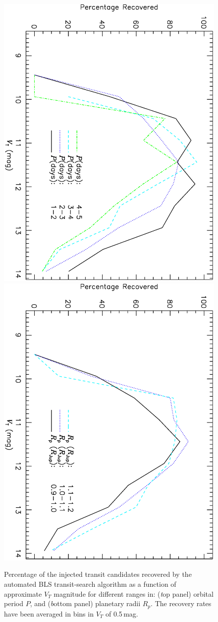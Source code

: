 \begin{figure}
\begin{center}
\centering
\includegraphics[width=.55\textwidth, angle=90]{7_comp_d}\\
\includegraphics[width=.55\textwidth, angle=90]{7_comp_e}\\
\caption[BLS recovery rates for different orbital periods and planetary radii]{%
Percentage of the injected transit candidates recovered by the automated BLS transit-search algorithm as a function of approximate $V_{T}$ magnitude for different ranges in: %
({\textit top panel}) orbital period $P$, and %
({\textit bottom panel}) planetary radii $R_{p}$. %
The recovery rates have been averaged in bins in $V_{T}$ of 0.5\,mag.%
}\label{cha:human:sec:model:fig:recrates1}
\end{center}
\end{figure}

